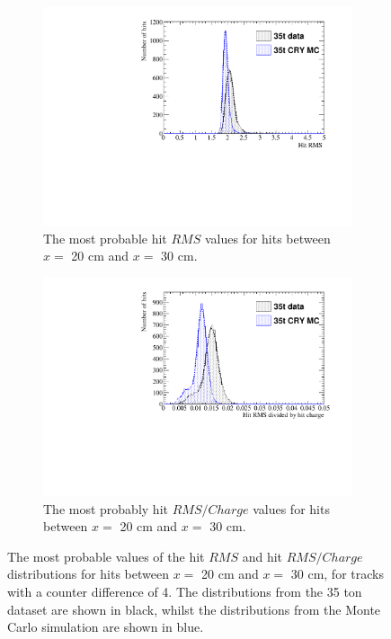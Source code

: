 \begin{figure}[h!]
  \centering
  \begin{subfigure}{0.45\textwidth}
    \centering
    \includegraphics[width=\textwidth]{CombCan_0}
    \caption{The most probable hit $RMS$ values for hits between $x =$ 20 cm and $x =$ 30 cm.}
    \label{fig:DiffMCHitFit_RMS}
  \end{subfigure}
  \hspace{0.08\textwidth}
  \begin{subfigure}{0.45\textwidth}
    \centering
    \includegraphics[width=\textwidth]{CombCan_2}
    \caption{The most probably hit $RMS/Charge$ values for hits between $x =$ 20 cm and $x =$ 30 cm.}
    \label{fig:DiffMCHitFit_RMS_Int}
  \end{subfigure}
  \caption[The most probable values of the hit $RMS$ and hit $RMS/Charge$ distributions for tracks with a counter difference of 4 in a low noise 35 ton detector]
          {The most probable values of the hit $RMS$ and hit $RMS/Charge$ distributions for hits between $x =$ 20 cm and $x =$ 30 cm, for tracks with a counter difference of 4. The distributions from the 35 ton dataset are shown in black, whilst the distributions from the Monte Carlo simulation are shown in blue.}
          \label{fig:DiffMCHitFit}
\end{figure}

